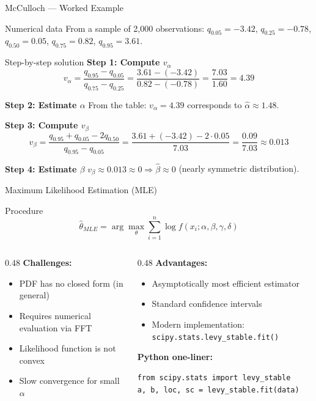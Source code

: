 \documentclass[9pt, aspectratio=169, t]{beamer}
\theoremstyle{definition}
\begin{document}
\begin{frame}{McCulloch --- Worked Example}
\begin{block}{Numerical data}
From a sample of 2{,}000 observations: $q_{0.05} = -3.42$, $q_{0.25} = -0.78$, $q_{0.50} = 0.05$, $q_{0.75} = 0.82$, $q_{0.95} = 3.61$.
\end{block}

\begin{exampleblock}{Step-by-step solution}
\textbf{Step 1: Compute $v_\alpha$}
$$v_\alpha = \frac{q_{0.95} - q_{0.05}}{q_{0.75} - q_{0.25}} = \frac{3.61 - (-3.42)}{0.82 - (-0.78)} = \frac{7.03}{1.60} = 4.39$$

\textbf{Step 2: Estimate $\alpha$}
From the table: $v_\alpha = 4.39$ corresponds to $\hat{\alpha} \approx 1.48$.

\textbf{Step 3: Compute $v_\beta$}
$$v_\beta = \frac{q_{0.95} + q_{0.05} - 2q_{0.50}}{q_{0.95} - q_{0.05}} = \frac{3.61 + (-3.42) - 2 \cdot 0.05}{7.03} = \frac{0.09}{7.03} \approx 0.013$$

\textbf{Step 4: Estimate $\beta$}
$v_\beta \approx 0.013 \approx 0 \Rightarrow \hat{\beta} \approx 0$ (nearly symmetric distribution).
\end{exampleblock}
\end{frame}

\begin{frame}[fragile]{Maximum Likelihood Estimation (MLE)}
\begin{block}{Procedure}
$$\hat{\theta}_{MLE} = \arg\max_{\theta} \sum_{i=1}^{n} \log f(x_i; \alpha, \beta, \gamma, \delta)$$
\end{block}

\begin{columns}[T]
\begin{column}{0.48\textwidth}
\textbf{Challenges:}
\begin{itemize}
    \item PDF has no closed form (in general)
    \item Requires numerical evaluation via FFT
    \item Likelihood function is not convex
    \item Slow convergence for small $\alpha$
\end{itemize}
\end{column}
\begin{column}{0.48\textwidth}
\textbf{Advantages:}
\begin{itemize}
    \item Asymptotically most efficient estimator
    \item Standard confidence intervals
    \item Modern implementation: \texttt{scipy.stats.levy\_stable.fit()}
\end{itemize}

\vspace{0.2cm}
\textbf{Python one-liner:}
\begin{lstlisting}
from scipy.stats import levy_stable
a, b, loc, sc = levy_stable.fit(data)
\end{lstlisting}
\end{column}
\end{columns}
\end{frame}
\end{document}
